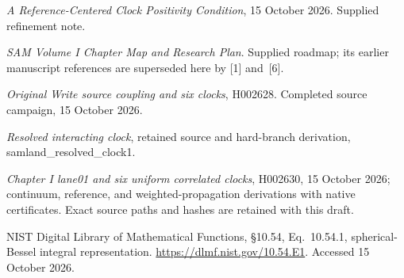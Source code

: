 \documentclass[10pt,twocolumn,letterpaper]{article}
\begin{document}
\noindent[2] \emph{A Reference-Centered Clock Positivity Condition}, 15 October 2026. Supplied refinement note.

\noindent[3] \emph{SAM Volume I Chapter Map and Research Plan}. Supplied roadmap; its earlier manuscript references are superseded here by [1] and~[6].

\noindent[4] \emph{Original Write source coupling and six clocks}, H002628. Completed source campaign, 15 October 2026.

\noindent[5] \emph{Resolved interacting clock}, retained source and hard-branch derivation, samland\_resolved\_clock1.

\noindent[6] \emph{Chapter I lane01 and six uniform correlated clocks}, H002630, 15 October 2026; continuum, reference, and weighted-propagation derivations with native certificates. Exact source paths and hashes are retained with this draft.

\noindent[7] NIST Digital Library of Mathematical Functions, \S10.54, Eq.~10.54.1, spherical-Bessel integral representation. \url{https://dlmf.nist.gov/10.54.E1}. Accessed 15 October 2026.

\endgroup
\end{document}
